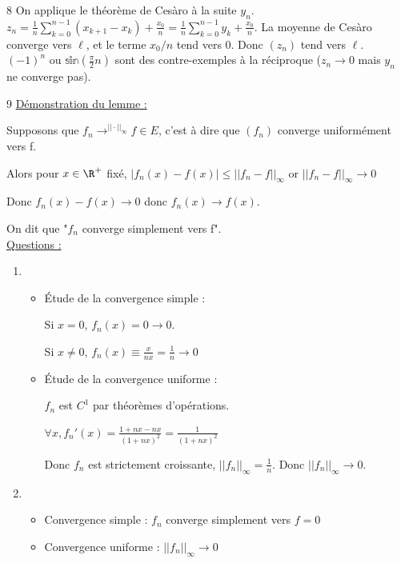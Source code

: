 \begin{correction}{8}
On applique le théorème de Cesàro à la suite $y_{n}$.
$z_n = \frac{1}{n} \sum_{k=0}^{n-1} (x_{k+1}-x_k) + \frac{x_0}{n} = \frac{1}{n} \sum_{k=0}^{n-1} y_k + \frac{x_0}{n}$.
La moyenne de Cesàro converge vers $\ell$, et le terme $x_0/n$ tend vers 0. Donc $(z_n)$ tend vers $\ell$.\\

$(-1)^n$ ou $\mathbb{sin}(\frac{\pi}2 n)$ sont des contre-exemples à la réciproque ($z_n \to 0$ mais $y_n$ ne converge pas).
\end{correction}

\begin{correction}{9}
\uline{Démonstration du lemme :}

Supposons que $f_n \rightarrow^{||\cdot||_{\infty}} f \in E$, c'est à dire que $(f_n)$ converge uniformément vers f.

Alors pour $x \in \R^{+}$ fixé, $|f_n(x) - f(x)| \leqslant ||f_n - f||_{\infty}$ or $||f_n - f||_{\infty} \rightarrow 0$

Donc $f_n(x) - f(x) \rightarrow 0$ donc $f_n(x) \rightarrow f(x)$.

On dit que "$f_n$ converge simplement vers f".\\

\uline{Questions :}
\begin{enumerate}
    \item~
    \begin{itemize}
        \item Étude de la convergence simple :

        Si $x = 0$, $f_n(x) = 0 \rightarrow 0$.

        Si $x \not \equal 0$, $f_n(x) \equiv \frac{x}{nx} = \frac 1 n \rightarrow 0$

        \item Étude de la convergence uniforme :

        $f_n$ est $C^1$ par théorèmes d'opérations.

        $\forall x, f_n'(x) = \frac{1 + nx - nx}{(1 + nx)^2} = \frac 1 {(1 + nx)^2}$

        Donc $f_n$ est strictement croissante, $||f_n||_{\infty} = \frac 1 n$. Donc $||f_n||_{\infty} \rightarrow 0$.
    \end{itemize}

    \item~
    \begin{itemize}
        \item Convergence simple : $f_n$ converge simplement vers $f = 0$
        \item Convergence uniforme : $||f_n||_{\infty} \rightarrow 0$
    \end{itemize}
    

\end{enumerate}
\end{correction}
